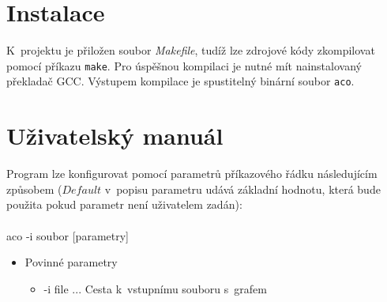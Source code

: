 \documentclass[a4paper, 12pt]{article}
\begin{document}
\newpage
\appendix
\section{Instalace}
K~projektu je přiložen soubor \emph{Makefile}, tudíž lze zdrojové kódy zkompilovat pomocí příkazu \texttt{make}. Pro úspěšnou kompilaci je nutné mít
nainstalovaný překladač GCC. Výstupem kompilace je spustitelný binární soubor \texttt{aco}.
\label{app:install}
\section{Uživatelský manuál}
\label{app:help}
Program lze konfigurovat pomocí parametrů příkazového řádku následujícím způsobem ($Default$ v~popisu parametru udává základní hodnotu,
která bude použita pokud parametr není uživatelem zadán):
\\
\\
  aco -i soubor [parametry]
  \begin{itemize}
  \item Povinné parametry
    \begin{itemize}
      \item -i file ... Cesta k~vstupnímu souboru s~grafem
    \end{itemize}
  \end{itemize}
\end{document}
